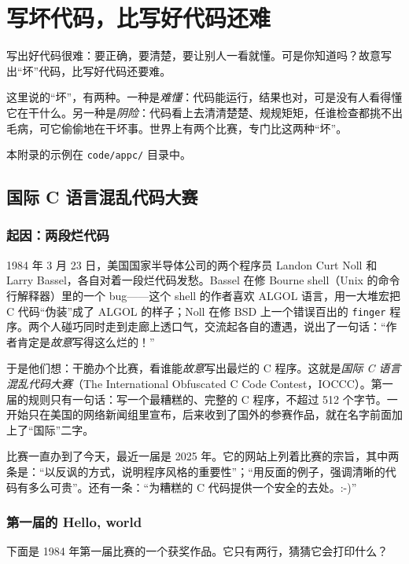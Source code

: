 \chapter{写坏代码，比写好代码还难}
\label{app:evil-code}

写出好代码很难：要正确，要清楚，要让别人一看就懂。可是你知道吗？故意写出“坏”代码，比写好代码还要难。

这里说的“坏”，有两种。一种是\emph{难懂}：代码能运行，结果也对，可是没有人看得懂它在干什么。另一种是\emph{阴险}：代码看上去清清楚楚、规规矩矩，任谁检查都挑不出毛病，可它偷偷地在干坏事。世界上有两个比赛，专门比这两种“坏”。

本附录的示例在 \texttt{code/appc/} 目录中。

\section{国际 C 语言混乱代码大赛}

\subsection{起因：两段烂代码}

1984 年 3 月 23 日，美国国家半导体公司的两个程序员 Landon Curt Noll 和 Larry Bassel，各自对着一段烂代码发愁。Bassel 在修 Bourne shell（Unix 的命令行解释器）里的一个 bug——这个 shell 的作者喜欢 ALGOL 语言，用一大堆宏把 C 代码“伪装”成了 ALGOL 的样子；Noll 在修 BSD 上一个错误百出的 \texttt{finger} 程序。两个人碰巧同时走到走廊上透口气，交流起各自的遭遇，说出了一句话：“作者肯定是\emph{故意}写得这么烂的！”

于是他们想：干脆办个比赛，看谁能\emph{故意}写出最烂的 C 程序。这就是\emph{国际 C 语言混乱代码大赛}（The International Obfuscated C Code Contest，IOCCC）。第一届的规则只有一句话：写一个最糟糕的、完整的 C 程序，不超过 512 个字节。一开始只在美国的网络新闻组里宣布，后来收到了国外的参赛作品，就在名字前面加上了“国际”二字。

比赛一直办到了今天，最近一届是 2025 年。它的网站上列着比赛的宗旨，其中两条是：“以反讽的方式，说明程序风格的重要性”；“用反面的例子，强调清晰的代码有多么可贵”。还有一条：“为糟糕的 C 代码提供一个安全的去处。:-)”

\subsection{第一届的 Hello, world}

下面是 1984 年第一届比赛的一个获奖作品。它只有两行，猜猜它会打印什么？

